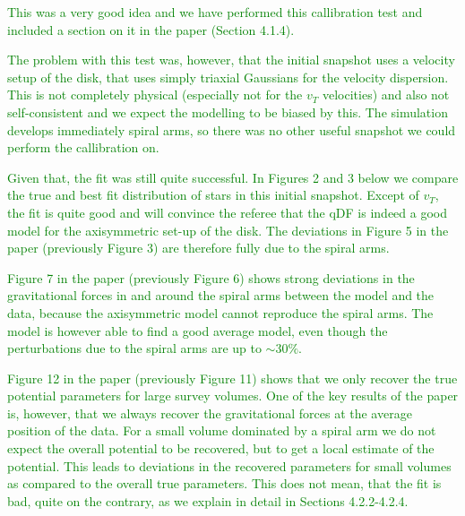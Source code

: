 \documentclass[10pt,a4paper]{article}
\newcommand{\Answer}[1]{\textcolor{Green}{#1}}
\begin{document}
\Answer{This was a very good idea and we have performed this callibration test and included a section on it in the paper (Section 4.1.4).}

\Answer{The problem with this test was, however, that the initial snapshot uses a velocity setup of the disk, that uses simply triaxial Gaussians for the velocity dispersion. This is not completely physical (especially not for the $v_T$ velocities) and also not self-consistent and we expect the modelling to be biased by this. The simulation develops immediately spiral arms, so there was no other useful snapshot we could perform the callibration on.}

\Answer{Given that, the fit was still quite successful. In Figures 2 and 3 below we compare the true and best fit distribution of stars in this initial snapshot. Except of $v_T$, the fit is quite good and will convince the referee that the qDF is indeed a good model for the axisymmetric set-up of the disk. The deviations in Figure 5 in the paper (previously Figure 3) are therefore fully due to the spiral arms.}

\Answer{Figure 7 in the paper (previously Figure 6) shows strong deviations in the gravitational forces in and around the spiral arms between the model and the data, because the axisymmetric model cannot reproduce the spiral arms. The model is however able to find a good average model, even though the perturbations due to the spiral arms are up to $\sim30\%$.}

\Answer{Figure 12 in the paper (previously Figure 11) shows that we only recover the true potential parameters for large survey volumes. One of the key results of the paper is, however, that we always recover the gravitational forces at the average position of the data. For a small volume dominated by a spiral arm we do not expect the overall potential to be recovered, but to get a local estimate of the potential. This leads to deviations in the recovered parameters for small volumes as compared to the overall true parameters. This does not mean, that the fit is bad, quite on the contrary, as we explain in detail in Sections 4.2.2-4.2.4.}
\end{document}
